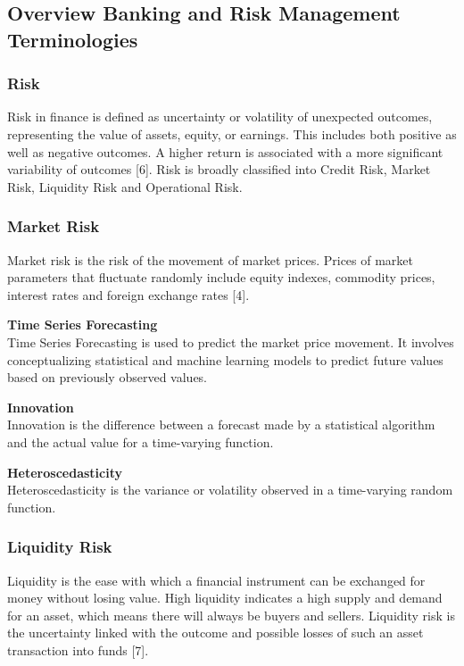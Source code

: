 \documentclass[a4paper, 12pt]{article}
\begin{document}
\vskip 0.2in
\subsection{Overview Banking and Risk Management Terminologies}
\subsubsection{Risk}
\noindent Risk in finance is defined as uncertainty or volatility of unexpected outcomes, representing the value of assets, equity, or earnings. This includes both positive as well as negative outcomes. A higher return is associated with a more significant variability of outcomes [6]. Risk is broadly classified into Credit Risk, Market Risk, Liquidity Risk and Operational Risk.

\vskip 0.2in
\subsubsection{Market Risk}
\noindent Market risk is the risk of the movement of market prices. Prices of market parameters that fluctuate randomly include equity indexes, commodity prices, interest rates and foreign exchange rates [4].

\vskip 0.2in
\noindent\textbf{Time Series Forecasting} \\
\noindent Time Series Forecasting is used to predict the market price movement. It involves conceptualizing statistical and machine learning models to predict future values based on previously observed values.

\vskip 0.2in
\noindent\textbf{Innovation} \\
\noindent Innovation is the difference between a forecast made by a statistical algorithm and the actual value for a time-varying function.

\vskip 0.2in
\noindent\textbf{Heteroscedasticity} \\
\noindent Heteroscedasticity is the variance or volatility observed in a time-varying random function.

\vskip 0.2in
\subsubsection{Liquidity Risk}
\noindent Liquidity is the ease with which a financial instrument can be exchanged for money without losing value. High liquidity indicates a high supply and demand for an asset, which means there will always be buyers and sellers. Liquidity risk is the uncertainty linked with the outcome and possible losses of such an asset transaction into funds [7].
\end{document}
